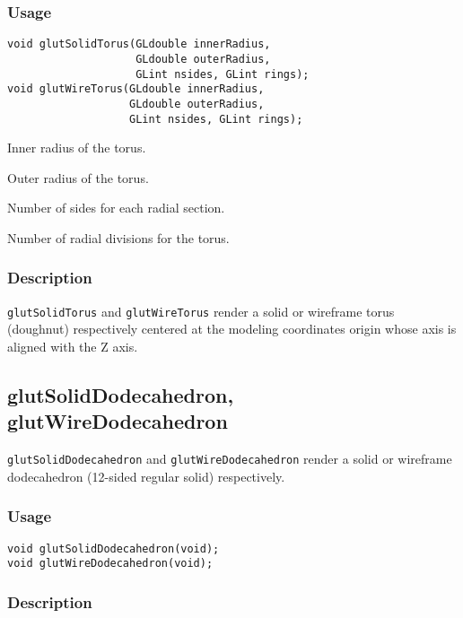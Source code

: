 \subsubsection*{Usage}
\begin{verbatim}
void glutSolidTorus(GLdouble innerRadius,
                    GLdouble outerRadius,
                    GLint nsides, GLint rings);
void glutWireTorus(GLdouble innerRadius,
                   GLdouble outerRadius,
                   GLint nsides, GLint rings);
\end{verbatim}
\begin{description}
\itemsep 0in
\item[\tt innerRadius]
Inner radius of the torus.
\item[\tt outerRadius]
Outer radius of the torus.
\item[\tt nsides]
Number of sides for each radial section.
\item[\tt rings]
Number of radial divisions for the torus.
\end{description}

\subsubsection*{Description}

{\tt glutSolidTorus} and {\tt glutWireTorus} render a solid or wireframe
torus (doughnut) respectively centered at the modeling coordinates origin whose axis is aligned
with the Z axis.

\subsection{glutSolidDodecahedron, glutWireDodecahedron}

{\tt glutSolidDodecahedron} and {\tt glutWireDodecahedron} render a solid or wireframe
dodecahedron (12-sided regular solid) respectively.

\subsubsection*{Usage}
\begin{verbatim}
void glutSolidDodecahedron(void);
void glutWireDodecahedron(void);
\end{verbatim}

\subsubsection*{Description}


